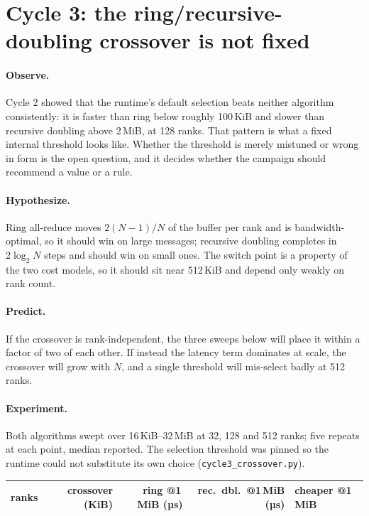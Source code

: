 \documentclass[11pt]{article}
\begin{document}
\setcounter{section}{2}
\setcounter{figure}{2}
\setcounter{page}{4}

\section{Cycle 3: the ring/recursive-doubling crossover is not fixed}

\paragraph{Observe.} Cycle 2 showed that the runtime's default selection beats
neither algorithm consistently: it is faster than ring below roughly 100\,KiB
and slower than recursive doubling above 2\,MiB, at 128 ranks. That pattern is
what a fixed internal threshold looks like. Whether the threshold is merely
mistuned or wrong in form is the open question, and it decides whether the
campaign should recommend a value or a rule.

\paragraph{Hypothesize.} Ring all-reduce moves $2(N-1)/N$ of the buffer per rank
and is bandwidth-optimal, so it should win on large messages; recursive
doubling completes in $2\log_2 N$ steps and should win on small ones. The
switch point is a property of the two cost models, so it should sit near
512\,KiB and depend only weakly on rank count.

\paragraph{Predict.} If the crossover is rank-independent, the three sweeps
below will place it within a factor of two of each other. If instead the
latency term dominates at scale, the crossover will grow with $N$, and a single
threshold will mis-select badly at 512 ranks.

\paragraph{Experiment.} Both algorithms swept over 16\,KiB--32\,MiB at 32, 128
and 512 ranks; five repeats at each point, median reported. The selection
threshold was pinned so the runtime could not substitute its own choice
(\texttt{cycle3\_crossover.py}).

\begin{table}[h]
\centering
\begin{tabular}{rrrrl}
\toprule
ranks & crossover (KiB) & ring @1\,MiB (µs) & rec.\ dbl.\ @1\,MiB (µs) & cheaper @1\,MiB \\
\midrule

\bottomrule
\end{tabular}
\end{table}
\end{document}
